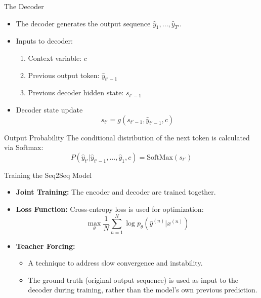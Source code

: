 \documentclass[aspectratio=169]{beamer}
\begin{document}
\begin{frame}{The Decoder}
	\begin{itemize}
		\item The decoder generates the output sequence $\hat{y}_1, \dots, \hat{y}_{T'}$.
		\item Inputs to decoder:
		\begin{enumerate}
			\item Context variable: $c$
			\item Previous output token: $\hat{y}_{t'-1}$
			\item Previous decoder hidden state: $s_{t'-1}$
		\end{enumerate}
		\item Decoder state update
	\begin{equation}
	s_{t'} = g(s_{t'-1}, \hat{y}_{t'-1}, c)
\end{equation}
	\end{itemize}
		
	\begin{block}{Output Probability}
		The conditional distribution of the next token is calculated via Softmax:
		\begin{equation}
			P(\hat{y}_{t'} | \hat{y}_{t'-1}, \dots, \hat{y}_1, c) = \text{SoftMax}(s_{t'})
		\end{equation}
	\end{block}
\end{frame}

\begin{frame}{Training the Seq2Seq Model}
	\begin{itemize}
		\item \textbf{Joint Training:} The encoder and decoder are trained together.
		\item \textbf{Loss Function:} Cross-entropy loss is used for optimization:
		\begin{equation}
			\max_{\theta} \frac{1}{N} \sum_{n=1}^{N} \log p_{\theta}(\hat{y}^{(n)} | x^{(n)})
		\end{equation}
		\item \textbf{Teacher Forcing:}
		\begin{itemize}
			\item A technique to address slow convergence and instability.
			\item The ground truth (original output sequence) is used as input to the decoder during training, rather than the model's own previous prediction.
		\end{itemize}
	\end{itemize}
\end{frame}
\end{document}

